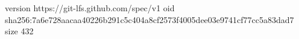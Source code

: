 version https://git-lfs.github.com/spec/v1
oid sha256:7a6e728aacaa40226b291c5c404a8cf2573f4005dee03e9741cf77cc5a83dad7
size 432
